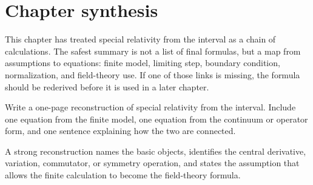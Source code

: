 \section{Chapter synthesis}

This chapter has treated special relativity from the interval as a chain of calculations.  The safest summary is not a list of final formulas, but a map from assumptions to equations: finite model, limiting step, boundary condition, normalization, and field-theory use.  If one of those links is missing, the formula should be rederived before it is used in a later chapter.

\begin{exercise}
Write a one-page reconstruction of special relativity from the interval.  Include one equation from the finite model, one equation from the continuum or operator form, and one sentence explaining how the two are connected.
\begin{answer}
A strong reconstruction names the basic objects, identifies the central derivative, variation, commutator, or symmetry operation, and states the assumption that allows the finite calculation to become the field-theory formula.
\end{answer}
\end{exercise}
